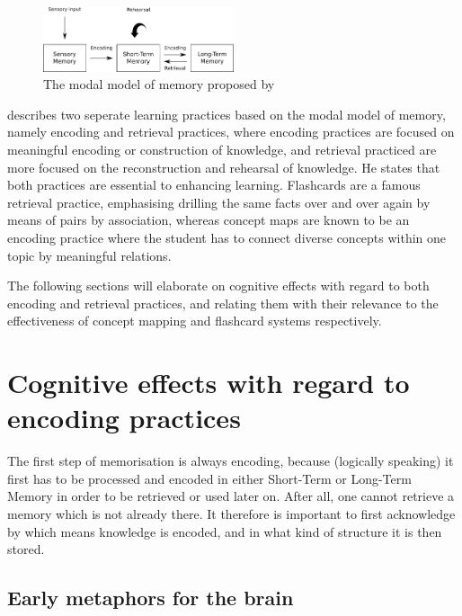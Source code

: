 \begin{figure}
    \centering
    \includegraphics[width=0.5\textwidth]{img/modalmemory.png}
    \caption{The modal model of memory proposed by \protect{}}
    \label{fig:modalmemory}
\end{figure}

 describes two seperate learning practices based on the modal model of memory, namely encoding and retrieval practices, where encoding practices are focused on meaningful encoding or construction of knowledge, and retrieval practiced are more focused on the reconstruction and rehearsal of knowledge. He states that both practices are essential to enhancing learning. Flashcards are a famous retrieval practice, emphasising drilling the same facts over and over again by means of pairs by association, whereas concept maps are known to be an encoding practice where the student has to connect diverse concepts within one topic by meaningful relations.

The following sections will elaborate on cognitive effects with regard to both encoding and retrieval practices, and relating them with their relevance to the effectiveness of concept mapping and flashcard systems respectively.

\section{Cognitive effects with regard to encoding practices}

The first step of memorisation is always encoding, because (logically speaking) it first has to be processed and encoded in either Short-Term or Long-Term Memory in order to be retrieved or used later on. After all, one cannot retrieve a memory which is not already there. It therefore is important to first acknowledge by which means knowledge is encoded, and in what kind of structure it is then stored.

\subsection{Early metaphors for the brain}

